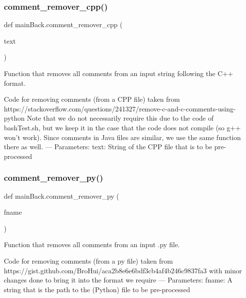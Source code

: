 \subsubsection{\texorpdfstring{comment\+\_\+remover\+\_\+cpp()}{comment\_remover\_cpp()}}
{\footnotesize\ttfamily def main\+Back.\+comment\+\_\+remover\+\_\+cpp (\begin{DoxyParamCaption}\item[{}]{text }\end{DoxyParamCaption})}



Function that removes all comments from an input string following the C++ format. 

\begin{DoxyVerb}Code for removing comments (from a CPP file) taken from https://stackoverflow.com/questions/241327/remove-c-and-c-comments-using-python
Note that we do not necessarily require this due to the code of bashTest.sh, but we keep it in the case that
the code does not compile (so g++ won't work).
Since comments in Java files are similar, we use the same function there as well.
---
Parameters:
text: String of the CPP file that is to be pre-processed
\end{DoxyVerb}
 \mbox{\label{namespacemain_back_a143f8fc662e5d0efc0118244031af2e1}} 
\subsubsection{\texorpdfstring{comment\+\_\+remover\+\_\+py()}{comment\_remover\_py()}}
{\footnotesize\ttfamily def main\+Back.\+comment\+\_\+remover\+\_\+py (\begin{DoxyParamCaption}\item[{}]{fname }\end{DoxyParamCaption})}



Function that removes all comments from an input .py file. 

\begin{DoxyVerb}Code for removing comments (from a py file) taken from  https://gist.github.com/BroHui/aca2b8e6e6bdf3cb4af4b246c9837fa3 with minor changes done to bring it into the format we require
---
Parameters: 
fname: A string that is the path to the (Python) file to be pre-processed
\end{DoxyVerb}
 \mbox{\label{namespacemain_back_a5dcd803071bf0623d43c399c733f233e}} 
